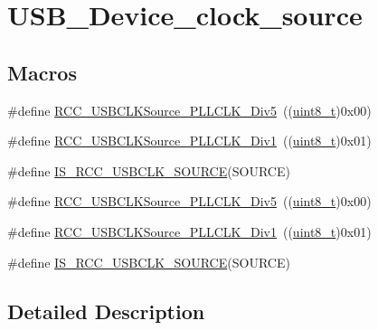 \hypertarget{group___u_s_b___device__clock__source}{}\section{U\+S\+B\+\_\+\+Device\+\_\+clock\+\_\+source}
\label{group___u_s_b___device__clock__source}
\subsection*{Macros}
\begin{DoxyCompactItemize}
\item 
\#define \hyperlink{group___u_s_b___device__clock__source_ga5e7a39e25fc37fd2b90edfe66bf1f53f}{R\+C\+C\+\_\+\+U\+S\+B\+C\+L\+K\+Source\+\_\+\+P\+L\+L\+C\+L\+K\+\_\+Div5}~((\hyperlink{_p_e___types_8h_aba7bc1797add20fe3efdf37ced1182c5}{uint8\+\_\+t})0x00)
\item 
\#define \hyperlink{group___u_s_b___device__clock__source_ga8162727793b5690d6b96ad0cc7ce3866}{R\+C\+C\+\_\+\+U\+S\+B\+C\+L\+K\+Source\+\_\+\+P\+L\+L\+C\+L\+K\+\_\+\+Div1}~((\hyperlink{_p_e___types_8h_aba7bc1797add20fe3efdf37ced1182c5}{uint8\+\_\+t})0x01)
\item 
\#define \hyperlink{group___u_s_b___device__clock__source_ga484f7834b5506d9879ed84660c894250}{I\+S\+\_\+\+R\+C\+C\+\_\+\+U\+S\+B\+C\+L\+K\+\_\+\+S\+O\+U\+R\+CE}(S\+O\+U\+R\+CE)
\item 
\#define \hyperlink{group___u_s_b___device__clock__source_ga5e7a39e25fc37fd2b90edfe66bf1f53f}{R\+C\+C\+\_\+\+U\+S\+B\+C\+L\+K\+Source\+\_\+\+P\+L\+L\+C\+L\+K\+\_\+Div5}~((\hyperlink{_p_e___types_8h_aba7bc1797add20fe3efdf37ced1182c5}{uint8\+\_\+t})0x00)
\item 
\#define \hyperlink{group___u_s_b___device__clock__source_ga8162727793b5690d6b96ad0cc7ce3866}{R\+C\+C\+\_\+\+U\+S\+B\+C\+L\+K\+Source\+\_\+\+P\+L\+L\+C\+L\+K\+\_\+\+Div1}~((\hyperlink{_p_e___types_8h_aba7bc1797add20fe3efdf37ced1182c5}{uint8\+\_\+t})0x01)
\item 
\#define \hyperlink{group___u_s_b___device__clock__source_ga484f7834b5506d9879ed84660c894250}{I\+S\+\_\+\+R\+C\+C\+\_\+\+U\+S\+B\+C\+L\+K\+\_\+\+S\+O\+U\+R\+CE}(S\+O\+U\+R\+CE)
\end{DoxyCompactItemize}


\subsection{Detailed Description}


